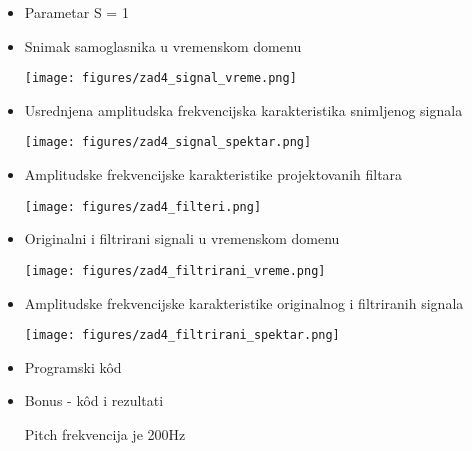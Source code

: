 
\begin{itemize}
    \item Parametar S = 1
    \item Snimak samoglasnika u vremenskom domenu
        \begin{center}
            \texttt{[image: figures/zad4\_signal\_vreme.png]}
        \end{center}
        
    \item Usrednjena amplitudska frekvencijska karakteristika snimljenog signala
        \begin{center}
            \texttt{[image: figures/zad4\_signal\_spektar.png]}
        \end{center}
        
    \item Amplitudske frekvencijske karakteristike projektovanih filtara
        \begin{center}
            \texttt{[image: figures/zad4\_filteri.png]}
        \end{center}
        
    \item Originalni i filtrirani signali u vremenskom domenu
        \begin{center}
            \texttt{[image: figures/zad4\_filtrirani\_vreme.png]}
        \end{center}
        
     \item Amplitudske frekvencijske karakteristike originalnog i filtriranih signala
         \begin{center}
            \texttt{[image: figures/zad4\_filtrirani\_spektar.png]}
        \end{center}
    \item Programski k\^{o}d 
    
    
    \item Bonus - k\^{o}d i rezultati
    
    Pitch frekvencija je 200Hz
\end{itemize}